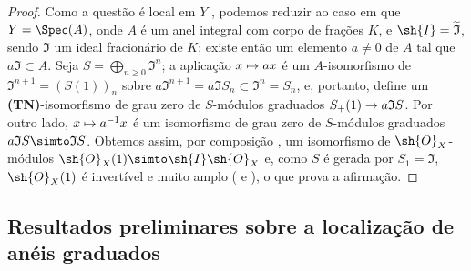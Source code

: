 \documentclass[oneside,10pt]{amsart}
\makeatletter
\renewcommand{\geq}{\geqslant}
\newcommand{\ega@arrow}[2]{\mathchoice{#1}{#2}{#2}{#2}}
\let\ega@shortmapsto\mapsto
\renewcommand{\to}{\ega@arrow{\longrightarrow}{\rightarrow}}
\renewcommand{\mapsto}{\ega@arrow{\longmapsto}{\ega@shortmapsto}}
\newcommand{\oldpage}[2][]{\marginnote{\normalfont\footnotesize\textbf{#1}~|~#2}\ignorespaces}
\let\EGAOriginalLabel\label
\renewcommand{\label}[1]{\phantomsection\EGAOriginalLabel{#1}}
\makeatother
\begin{document}
\begin{proof}
Como a questão é local em $Y$ , podemos reduzir ao caso em que $Y=\Spec(A)$, onde $A$ é um anel integral com corpo de frações $K$, e $\sh{I}=\widetilde{\mathfrak{I}}$, sendo $\mathfrak{I}$ um ideal fracionário de $K$;
existe então um elemento $a\neq0$ de $A$ tal que $a\mathfrak{I}\subset A$.
Seja $S=\bigoplus_{n\geq0}\mathfrak{I}^n$;
a aplicação $x\mapsto ax$ é um $A$-isomorfismo de $\mathfrak{I}^{n+1}=(S(1))_n$ sobre $a\mathfrak{I}^{n+1}=a\mathfrak{I}S_n\subset\mathfrak{I}^n=S_n$,
\oldpage[II]{157}
e, portanto, define um \textbf{(TN)}-isomorfismo de grau zero de $S$-módulos graduados $S_+(1)\to a\mathfrak{I}S$.
Por outro lado, $x\mapsto a^{-1}x$ é um isomorfismo de grau zero de $S$-módulos graduados $a\mathfrak{I}S\simto\mathfrak{I}S$.
Obtemos assim, por composição , um isomorfismo de $\sh{O}_X$-módulos $\sh{O}_X(1)\simto\sh{I}\sh{O}_X$ e, como $S$ é gerada por $S_1=\mathfrak{I}$, $\sh{O}_X(1)$ é invertível  e muito amplo ( e ), o que prova a afirmação.
\end{proof}

\subsection{Resultados preliminares sobre a localização de anéis graduados}
\label{subsection:II.8.2}
\end{document}
